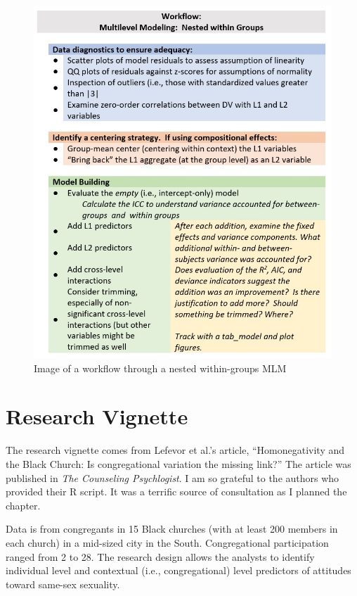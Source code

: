 \documentclass[
  11pt,
]{book}
\begin{document}
\begin{figure}
\centering
\includegraphics{images/wiGroups/MLM_workflow_xs.jpg}
\caption{Image of a workflow through a nested within-groups MLM}
\end{figure}

\hypertarget{research-vignette}{%
\section{Research Vignette}\label{research-vignette}}

The research vignette comes from Lefevor et al.'s \citeyearpar{lefevor_homonegativity_2020} article, ``Homonegativity and the Black Church: Is congregational variation the missing link?'' The article was published in \emph{The Counseling Psychlogist}. I am so grateful to the authors who provided their R script. It was a terrific source of consultation as I planned the chapter.

Data is from congregants in 15 Black churches (with at least 200 members in each church) in a mid-sized city in the South. Congregational participation ranged from 2 to 28. The research design allows the analysts to identify individual level and contextual (i.e., congregational) level predictors of attitudes toward same-sex sexuality.
\end{document}
